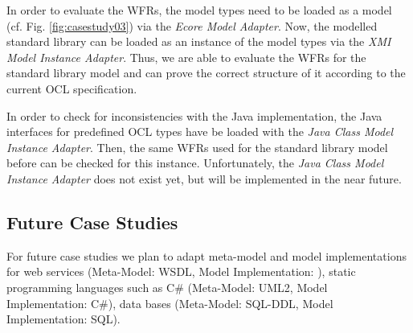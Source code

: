 In order to evaluate the WFRs, the model types need to be loaded as a model (cf. Fig. 
\ref{fig:casestudy03}) via the \textit{Ecore Model Adapter}. Now, the modelled standard library 
can be loaded as an instance of the model types via the \textit{XMI Model Instance Adapter}. Thus, 
we are able to evaluate the WFRs for the standard library model and can prove the correct 
structure of it according to the current OCL specification. 

In order to check for inconsistencies with the Java implementation, the Java interfaces 
for predefined OCL types have  be loaded with the \textit{Java Class Model Instance Adapter}. Then, the same WFRs 
used for the standard library model before can be checked for this instance. 
Unfortunately, the \textit{Java Class Model Instance Adapter} does not exist yet, but will be 
implemented in the near future.


\subsection{Future Case Studies}

For future case studies we plan to adapt meta-model and model implementations for web services (Meta-Model: WSDL, Model Implementation: ), static programming languages such as C\# (Meta-Model: UML2, Model Implementation: C\#), data bases (Meta-Model: SQL-DDL, Model Implementation: SQL). 

